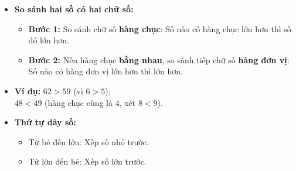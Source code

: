 \documentclass[11pt,a4paper]{article}
\begin{document}
\begin{minipage}[t]{0.49\textwidth}\vspace{0pt}
\begin{tcolorbox}[
  enhanced,
  colback=teal!4!white,
  colframe=teal!75!black,
  arc=2mm, boxrule=0.8pt,
  left=2mm, right=2mm, top=1.8mm, bottom=1.8mm,
  title={\footnotesize\bfseries\color{white}\faSliders\ 2. So sánh và thứ tự số}
]
{\footnotesize
\begin{itemize}\setlength{\itemsep}{1pt}\setlength{\leftskip}{-2.5mm}
  \item \textbf{So sánh hai số có hai chữ số:}
  \begin{itemize}\setlength{\itemsep}{0.5pt}\setlength{\leftskip}{-2.5mm}
    \item \textbf{Bước 1:} So sánh chữ số \textbf{hàng chục}: Số nào có hàng chục lớn hơn thì số đó lớn hơn.
    \item \textbf{Bước 2:} Nếu hàng chục \textbf{bằng nhau}, so sánh tiếp chữ số \textbf{hàng đơn vị}: Số nào có hàng đơn vị lớn hơn thì lớn hơn.
  \end{itemize}
  \item \textbf{Ví dụ:} $62 > 59$ (vì $6 > 5$);\\
        $48 < 49$ (hàng chục cùng là $4$, xét $8 < 9$).
  \item \textbf{Thứ tự dãy số:}
  \begin{itemize}\setlength{\itemsep}{0.5pt}\setlength{\leftskip}{-2.5mm}
    \item Từ bé đến lớn: Xếp số nhỏ trước.
    \item Từ lớn đến bé: Xếp số lớn trước.
  \end{itemize}
\end{itemize}
}
\end{tcolorbox}
\end{minipage}
\end{document}
